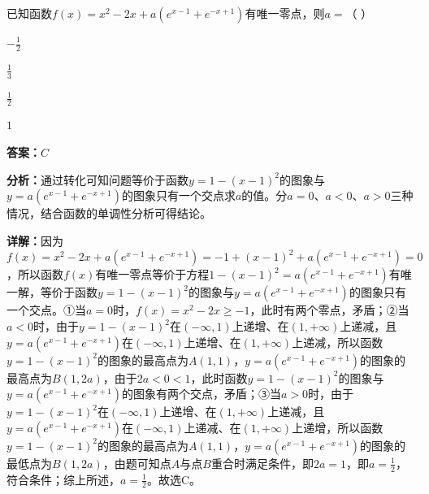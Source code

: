 \begin{question}[points=5]
已知函数$f(x)=x^2-2x+a(e^{x-1}+e^{-x+1})$有唯一零点，则$a=$（ ）
\begin{choices}
  \item $-\frac{1}{2}$
  \item $\frac{1}{3}$
  \item $\frac{1}{2}$
  \item $1$
\end{choices}
\begin{solution}
\textbf{答案：}$C$

\textbf{分析：}通过转化可知问题等价于函数$y=1-(x-1)^2$的图象与$y=a(e^{x-1}+e^{-x+1})$的图象只有一个交点求$a$的值。分$a=0$、$a<0$、$a>0$三种情况，结合函数的单调性分析可得结论。

\textbf{详解：}因为$f(x)=x^2-2x+a(e^{x-1}+e^{-x+1})=-1+(x-1)^2+a(e^{x-1}+e^{-x+1})=0$，所以函数$f(x)$有唯一零点等价于方程$1-(x-1)^2=a(e^{x-1}+e^{-x+1})$有唯一解，等价于函数$y=1-(x-1)^2$的图象与$y=a(e^{x-1}+e^{-x+1})$的图象只有一个交点。①当$a=0$时，$f(x)=x^2-2x\ge -1$，此时有两个零点，矛盾；②当$a<0$时，由于$y=1-(x-1)^2$在$(-\infty,1)$上递增、在$(1,+\infty)$上递减，且$y=a(e^{x-1}+e^{-x+1})$在$(-\infty,1)$上递增、在$(1,+\infty)$上递减，所以函数$y=1-(x-1)^2$的图象的最高点为$A(1,1)$，$y=a(e^{x-1}+e^{-x+1})$的图象的最高点为$B(1,2a)$，由于$2a<0<1$，此时函数$y=1-(x-1)^2$的图象与$y=a(e^{x-1}+e^{-x+1})$的图象有两个交点，矛盾；③当$a>0$时，由于$y=1-(x-1)^2$在$(-\infty,1)$上递增、在$(1,+\infty)$上递减，且$y=a(e^{x-1}+e^{-x+1})$在$(-\infty,1)$上递减、在$(1,+\infty)$上递增，所以函数$y=1-(x-1)^2$的图象的最高点为$A(1,1)$，$y=a(e^{x-1}+e^{-x+1})$的图象的最低点为$B(1,2a)$，由题可知点$A$与点$B$重合时满足条件，即$2a=1$，即$a=\frac{1}{2}$，符合条件；综上所述，$a=\frac{1}{2}$。故选C。
\end{solution}
\end{question}

